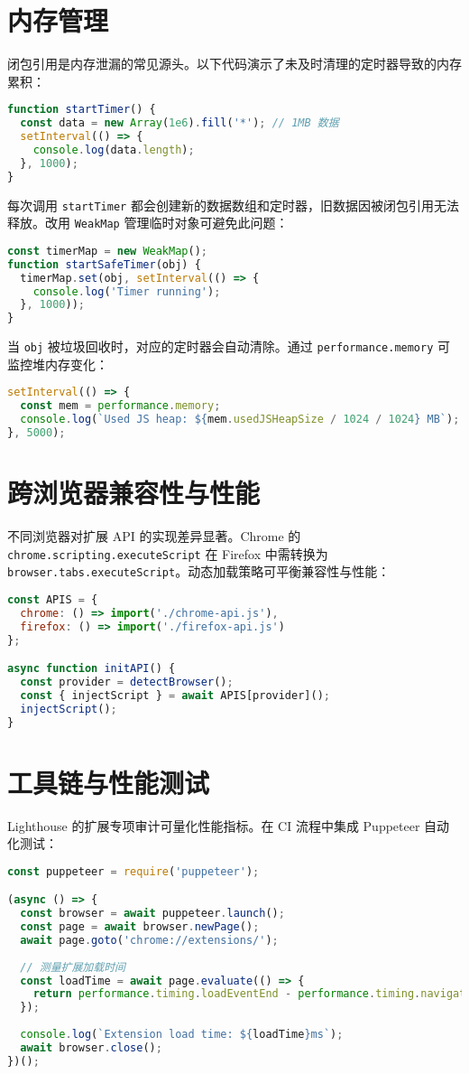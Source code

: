 \chapter{内存管理}
闭包引用是内存泄漏的常见源头。以下代码演示了未及时清理的定时器导致的内存累积：\par
\begin{lstlisting}[language=javascript]
function startTimer() {
  const data = new Array(1e6).fill('*'); // 1MB 数据
  setInterval(() => {
    console.log(data.length);
  }, 1000);
}
\end{lstlisting}
每次调用 \verb!startTimer! 都会创建新的数据数组和定时器，旧数据因被闭包引用无法释放。改用 \verb!WeakMap! 管理临时对象可避免此问题：\par
\begin{lstlisting}[language=javascript]
const timerMap = new WeakMap();
function startSafeTimer(obj) {
  timerMap.set(obj, setInterval(() => {
    console.log('Timer running');
  }, 1000));
}
\end{lstlisting}
当 \verb!obj! 被垃圾回收时，对应的定时器会自动清除。通过 \verb!performance.memory! 可监控堆内存变化：\par
\begin{lstlisting}[language=javascript]
setInterval(() => {
  const mem = performance.memory;
  console.log(`Used JS heap: ${mem.usedJSHeapSize / 1024 / 1024} MB`);
}, 5000);
\end{lstlisting}
\chapter{跨浏览器兼容性与性能}
不同浏览器对扩展 API 的实现差异显著。Chrome 的 \verb!chrome.scripting.executeScript! 在 Firefox 中需转换为 \verb!browser.tabs.executeScript!。动态加载策略可平衡兼容性与性能：\par
\begin{lstlisting}[language=javascript]
const APIS = {
  chrome: () => import('./chrome-api.js'),
  firefox: () => import('./firefox-api.js')
};

async function initAPI() {
  const provider = detectBrowser();
  const { injectScript } = await APIS[provider]();
  injectScript();
}
\end{lstlisting}
\chapter{工具链与性能测试}
Lighthouse 的扩展专项审计可量化性能指标。在 CI 流程中集成 Puppeteer 自动化测试：\par
\begin{lstlisting}[language=javascript]
const puppeteer = require('puppeteer');

(async () => {
  const browser = await puppeteer.launch();
  const page = await browser.newPage();
  await page.goto('chrome://extensions/');
  
  // 测量扩展加载时间
  const loadTime = await page.evaluate(() => {
    return performance.timing.loadEventEnd - performance.timing.navigationStart;
  });
  
  console.log(`Extension load time: ${loadTime}ms`);
  await browser.close();
})();
\end{lstlisting}
